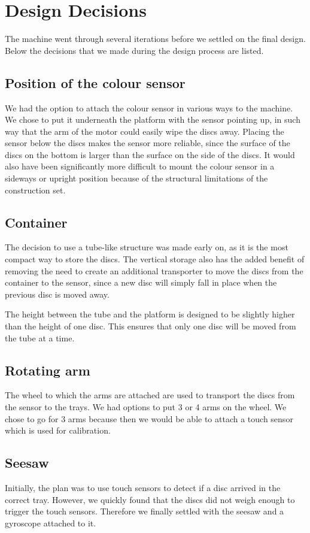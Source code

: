 \documentclass[a4paper,oneside,11pt]{article}
\begin{document}
\section{Design Decisions}
The machine went through several iterations before we settled on the final design. Below the decisions that we made during the design process are listed.

\subsection{Position of the colour sensor}
We had the option to attach the colour sensor in various ways to the machine. We chose to put it underneath the platform with the sensor pointing up, in such way that the arm of the motor could easily wipe the discs away.  Placing the sensor below the discs makes the sensor more reliable, since the surface of the discs on the bottom is larger than the surface on the side of the discs. It would also have been significantly more difficult to mount the colour sensor in a sideways or upright position because of the structural limitations of the construction set.

\subsection{Container}
The decision to use a tube-like structure was made early on, as it is the most compact way to store the discs. The vertical storage also has the added benefit of removing the need to create an additional transporter to move the discs from the container to the sensor, since a new disc will simply fall in place when the previous disc is moved away.

The height between the tube and the platform is designed to be slightly higher than the height of one disc. This ensures that only one disc will be moved from the tube at a time.

\subsection{Rotating arm}
The wheel to which the arms are attached are used to transport the discs from the sensor to the trays. We had options to put 3 or 4 arms on the wheel. We chose to go for 3 arms because then we would be able to attach a touch sensor which is used for calibration.

\subsection{Seesaw}
Initially, the plan was to use touch sensors to detect if a disc arrived in the correct tray. However, we quickly found that the discs did not weigh enough to trigger the touch sensors. Therefore we finally settled with the seesaw and a gyroscope attached to it.
\end{document}
